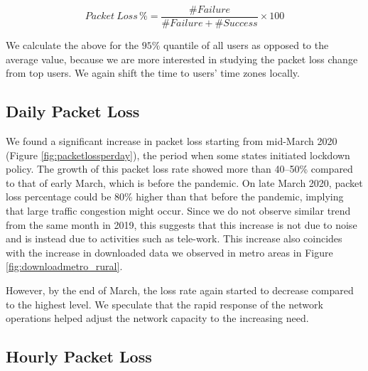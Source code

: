 \begin{equation}
    Packet \ Loss\, \% = \frac{\#Failure }{\#Failure + \#Success} \times 100
\end{equation}

We calculate the above for the $95\%$ quantile of all users as opposed to the average value, because we are more interested in studying the packet loss change from top users. We again shift the time to users' time zones locally.

\subsection{Daily Packet Loss}

  
We found a significant increase in packet loss starting from mid-March 2020 (Figure \ref{fig:packetlossperday}), the period when some states initiated lockdown policy. The growth of this packet loss rate showed more than 40--50\% compared to that of early March, which is before the pandemic. On late March 2020, packet loss percentage could be 80\% higher than that before the pandemic, implying that large traffic congestion might occur. Since we do not observe similar trend from the same month in 2019, this suggests that this increase is not due to noise and is instead due to activities such as tele-work. This increase also coincides with the increase in downloaded data we observed in metro areas in Figure \ref{fig:downloadmetro_rural}.

However, by the end of March, the loss rate again started to decrease compared to the highest level. We speculate that the rapid response of the network operations helped adjust the network capacity to the increasing need.

\subsection{Hourly Packet Loss}


